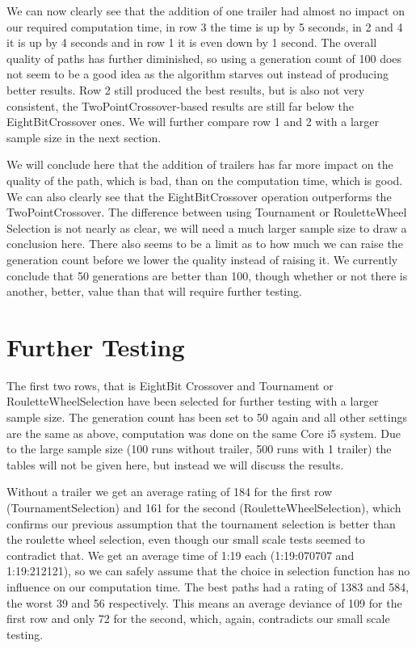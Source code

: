 We can now clearly see that the addition of one trailer had almost no impact on our required computation time, in row 3 the time is up by 5 seconds, in 2 and 4 it is up by 4 seconds and in row 1 it is even down by 1 second. The overall quality of paths has further diminished, so using a generation count of 100 does not seem to be a good idea as the algorithm starves out instead of producing better results. Row 2 still produced the best results, but is also not very consistent, the TwoPointCrossover-based results are still far below the EightBitCrossover ones. We will further compare row 1 and 2 with a larger sample size in the next section.

We will conclude here that the addition of trailers has far more impact on the quality of the path, which is bad, than on the computation time, which is good. We can also clearly see that the EightBitCrossover operation outperforms the TwoPointCrossover. The difference between using Tournament or RouletteWheel Selection is not nearly as clear, we will need a much larger sample size to draw a conclusion here. 
There also seems to be a limit as to how much we can raise the generation count before we lower the quality instead of raising it. We currently conclude that 50 generations are better than 100, though whether or not there is another, better, value than that will require further testing.

\section{Further Testing}
\label{sec:further_testing}

The first two rows, that is EightBit Crossover and Tournament or RouletteWheelSelection have been selected for further testing with a larger sample size. The generation count has been set to 50 again and all other settings are the same as above, computation was done on the same Core i5 system. Due to the large sample size (100 runs without trailer, 500 runs with 1 trailer) the tables will not be given here, but instead we will discuss the results.

Without a trailer we get an average rating of 184 for the first row (TournamentSelection) and 161 for the second (RouletteWheelSelection), which confirms our previous assumption that the tournament selection is better than the roulette wheel selection, even though our small scale tests seemed to contradict that. We get an average time of 1:19 each (1:19:070707 and 1:19:212121), so we can safely assume that the choice in selection function has no influence on our computation time. The best paths had a rating of 1383 and 584, the worst 39 and 56 respectively. This means an average deviance of 109 for the first row and only 72 for the second, which, again, contradicts our small scale testing.

